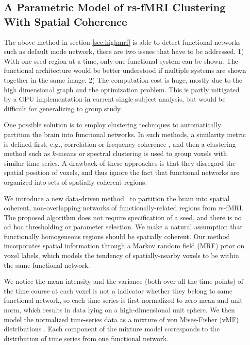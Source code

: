 \documentclass[12pt]{article}
\begin{document}
\subsection{A Parametric Model of rs-fMRI Clustering With Spatial Coherence}

The above method in section \ref{sec:highmrf} is able to detect functional
networks such as default mode network, there are two issues that have to be
addressed. 1) With one seed region at a time, only one functional system can be
shown. The functional architecture would be better understood if multiple
systems are shown together in the same image. 2) The computation cost is huge,
mostly due to the high dimensional graph and the optimization problem.  This is
partly mitigated by a GPU implementation in current single subject analysis, but
would be difficult for generalizing to group study.

One possible solution is to employ clustering techniques to automatically
partition the brain into functional networks. In such methods, a similarity
metric is defined first, e.g., correlation \cite{5074650} or frequency coherence
\cite{thirion2006detection}, and then a clustering method such as $k$-means or
spectral clustering is used to group voxels with similar time series. A drawback
of these approaches is that they disregard the spatial position of voxels, and
thus ignore the fact that functional networks are organized into sets of
spatially coherent regions.

We introduce a new data-driven method~\cite{liu2011monte} to partition the brain
into spatial coherent, non-overlapping networks of functionally-related regions
from rs-fMRI. The proposed algorithm does not require specification of a seed,
and there is no ad hoc thresholding or parameter selection. We make a natural
assumption that functionally homogeneous regions should be spatially
coherent. Our method incorporates spatial information through a Markov random
field (MRF) prior on voxel labels, which models the tendency of spatially-nearby
voxels to be within the same functional network.

We notice the mean intensity and the variance (both over all the time points) of
the time course at each voxel is not a indicator whether they belong to same
functional network, so each time series is first normalized to zero mean and unit
norm, which results in data lying on a high-dimensional unit sphere. We then
model the normalized time-series data as a mixture of von Mises-Fisher (vMF)
distributions \cite{banerjee2006clustering}. Each component of the mixture model
corresponds to the distribution of time series from one functional network.
\end{document}
